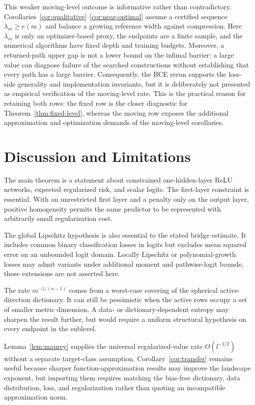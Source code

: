 \documentclass[pdflatex,sn-mathphys-num]{sn-jnl}
\theoremstyle{thmstyleone}
\theoremstyle{thmstyletwo}
\theoremstyle{thmstylethree}
\begin{document}


This weaker moving-level outcome is informative rather than contradictory. Corollaries~\ref{cor:qualitative}--\ref{cor:near-optimal} assume a certified sequence $\lambda_m\ge e(m)$ and balance a growing reference width against compression. Here $\lambda_m$ is only an optimizer-based proxy, the endpoints are a finite sample, and the numerical algorithms have fixed depth and training budgets. Moreover, a returned-path upper gap is not a lower bound on the infimal barrier: a large value can diagnose failure of the searched constructions without establishing that every path has a large barrier. Consequently, the BCE rerun supports the loss-side generality and implementation invariants, but it is deliberately not presented as empirical verification of the moving-level rate. This is the practical reason for retaining both rows: the fixed row is the closer diagnostic for Theorem~\ref{thm:fixed-level}, whereas the moving row exposes the additional approximation and optimization demands of the moving-level corollaries.

\section{Discussion and Limitations}\label{sec:discussion}

The main theorem is a statement about constrained one-hidden-layer ReLU networks, expected regularized risk, and scalar logits. The first-layer constraint is essential. With an unrestricted first layer and a penalty only on the output layer, positive homogeneity permits the same predictor to be represented with arbitrarily small regularization cost.

The global Lipschitz hypothesis is also essential to the stated bridge estimate. It includes common binary classification losses in logits but excludes mean squared error on an unbounded logit domain. Locally Lipschitz or polynomial-growth losses may admit variants under additional moment and pathwise-logit bounds; those extensions are not asserted here.

The rate $m^{-1/(n-1)}$ comes from a worst-case covering of the spherical active-direction dictionary. It can still be pessimistic when the active rows occupy a set of smaller metric dimension. A data- or dictionary-dependent entropy may sharpen the result further, but would require a uniform structural hypothesis on every endpoint in the sublevel.

Lemma~\ref{lem:maurey} supplies the universal regularized-value rate $O(l^{-1/2})$ without a separate target-class assumption. Corollary~\ref{cor:transfer} remains useful because sharper function-approximation results may improve the landscape exponent, but importing them requires matching the bias-free dictionary, data distribution, loss, and regularization rather than quoting an incompatible approximation norm.
\end{document}
